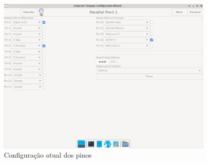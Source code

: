 \documentclass[twoside,a4paper]{refart}
\begin{document}
\begin{figure}[H]
    \begin{center}
        \includegraphics[width=0.95\textwidth]{imagens/stepconf_config.png}
    \end{center}
    \caption{Configuração atual dos pinos}\label{stepconfig}
\end{figure}
\end{document}
